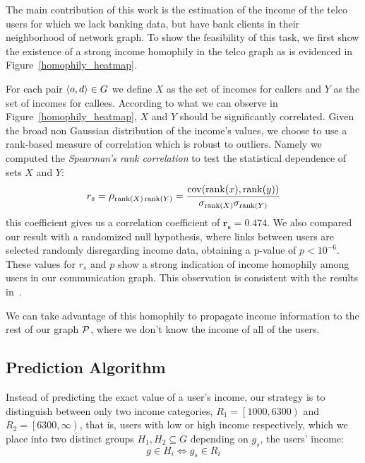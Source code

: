 The main contribution of this work is the estimation of the income of the telco users for which we lack banking data, but have bank clients in their neighborhood of network graph. To show the feasibility of this task, we first show the existence of a strong income homophily in the telco graph as is evidenced in Figure~\ref{homophily_heatmap}.


For each pair \( \left< o, d \right> \in \mathlarger{G} \) we define \( X \) as the set of incomes for callers and \( Y \) as the set of incomes for callees. According to what we can observe in Figure~\ref{homophily_heatmap}, \( X \) and \( Y \) should be significantly correlated. Given the broad non Gaussian distribution of the income's values, we choose to use a rank-based measure of correlation which is robust to outliers.
Namely we computed the \textit{Spearman's rank correlation} %
to test the statistical dependence of sets \( X \) and \( Y \):
\begin{equation}
r_s = \mathlarger{\rho}_{\operatorname{rank}(X) \operatorname{rank}(Y)} = \frac{\operatorname{cov}(\operatorname{rank}(x), \operatorname{rank}(y))}{\sigma_{\operatorname{rank}(X)} \sigma_{\operatorname{rank}(Y)}}
\label{spearman}
\end{equation}
this coefficient gives us a correlation coefficient of $\mathbf{r_s = 0.474}$. We also compared our result with a randomized null hypothesis, where links between users are selected randomly disregarding income data, obtaining a p-value of $ p < 10^{-6} $. These values for $r_s$ and $p$ show a strong indication of income homophily among users in our communication graph.
This observation is consistent with the results in~\cite{leo2015socioeconomic}.

We can take advantage of this homophily to propagate income information to the rest of our graph $ \mathcal{P} $, where we don't know the income of all of the users.


\subsection{Prediction Algorithm}

Instead of predicting the exact value of a user's income, our strategy is to distinguish between only two income categories, $R_1 = \left[1000, 6300\right)$ and $R_2 = \left[6300, \infty\right)$, that is, users with low or high income respectively, which we place into two distinct groups $ H_1, H_2 \subseteq G$ depending on \( g_s \), the users' income:
\[
	g \in H_i \iff g_s \in R_i
\]

